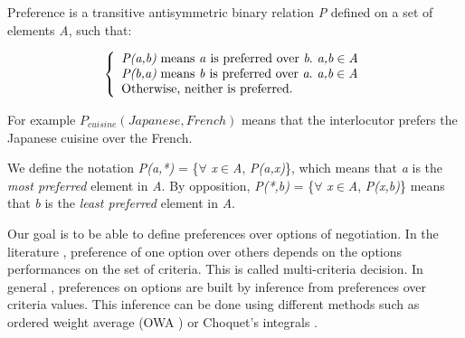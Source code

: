 \documentclass{llncs}
\begin{document}
 Preference is a transitive antisymmetric binary relation \emph{P} defined on a set of elements \emph{A}, such that:
 
 \[ \left \{
     \begin{array}{l}
 	\emph{P(a,b)} $ means \emph{a}  is preferred over $\emph{b}. \emph{ a,b} \in \emph{A}\\
 	\emph{P(b,a)} $ means  \emph{b} is preferred over $\emph{a}. \emph{ a,b} \in \emph{A}\\
 $Otherwise, neither is preferred. $\\
     \end{array}
    \right .\]

For example $P_{cuisine} (Japanese, French)$ means that the interlocutor prefers the Japanese cuisine over the French. 

\par  We define the notation \emph{P(a,*)}  = \{$\forall$ \emph{x}$\in$\emph{A}, \emph{P(a,x)}\}, which means that \emph{a} is the \textit{most preferred} element in \emph{A}. 
By opposition, \emph{P(*,b)} = \{$\forall$ \emph{x}$\in$\emph{A}, \emph{P(x,b)}\} means that \emph{b} is the \textit{least preferred} element in \emph{A}.
 
\par Our goal is to be able to define preferences over options of negotiation. 
In the literature \cite{dodgson2009multi}, preference of one option over others depends on the options performances on the set of criteria. This is called multi-criteria decision. In general \cite{dodgson2009multi}, preferences on options are built by inference from preferences over criteria values. This inference can be done using different methods such as ordered weight average (OWA \cite{yager2012ordered}) or Choquet's integrals \cite{chouquet1953}.
\end{document}
